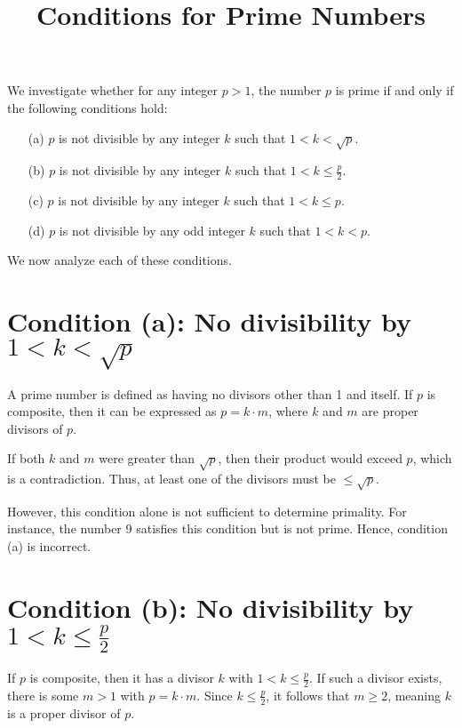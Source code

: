 \documentclass{article}
\begin{document}
\title{Conditions for Prime Numbers}
\author{}
\date{}
\maketitle

We investigate whether for any integer \( p > 1 \), the number \( p \) is prime if and only if the following conditions hold:

\begin{itemize}
    \item[(a)] \( p \) is not divisible by any integer \( k \) such that \( 1 < k < \sqrt{p} \).
    \item[(b)] \( p \) is not divisible by any integer \( k \) such that \( 1 < k \leq \frac{p}{2} \).
    \item[(c)] \( p \) is not divisible by any integer \( k \) such that \( 1 < k \leq p \).
    \item[(d)] \( p \) is not divisible by any odd integer \( k \) such that \( 1 < k < p \).
\end{itemize}

We now analyze each of these conditions.

\section*{Condition (a): No divisibility by \( 1 < k < \sqrt{p} \)}

A prime number is defined as having no divisors other than 1 and itself. If \( p \) is composite, then it can be expressed as \( p = k \cdot m \), where \( k \) and \( m \) are proper divisors of \( p \).

If both \( k \) and \( m \) were greater than \( \sqrt{p} \), then their product would exceed \( p \), which is a contradiction. Thus, at least one of the divisors must be \( \leq \sqrt{p} \).

However, this condition alone is not sufficient to determine primality. For instance, the number 9 satisfies this condition but is not prime. Hence, condition (a) is incorrect.

\section*{Condition (b): No divisibility by \( 1 < k \leq \frac{p}{2} \)}

If \( p \) is composite, then it has a divisor \( k \) with \( 1 < k \leq \frac{p}{2} \). If such a divisor exists, there is some \( m > 1 \) with \( p = k \cdot m \). Since \( k \leq \frac{p}{2} \), it follows that \( m \geq 2 \), meaning \( k \) is a proper divisor of \( p \).
\end{document}
